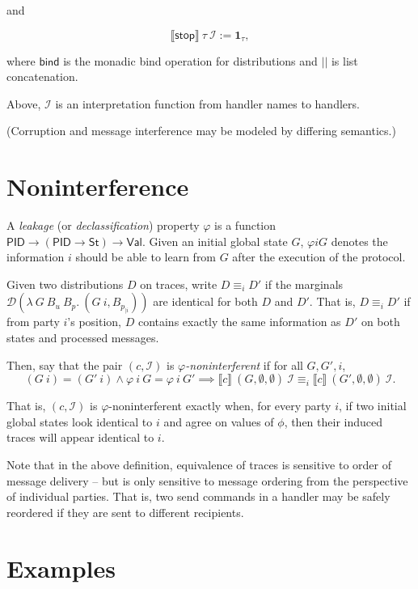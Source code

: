 \documentclass{article}
\newcommand{\Val}{\mathsf{Val}}
\newcommand{\St}{\mathsf{St}}
\newcommand{\PID}{\mathsf{PID}}
\begin{document}
and

\[\llbracket \textsf{stop} \rrbracket\ \tau\ \mathcal{I} := \mathbf{1}_{\tau},\]

where $\textsf{bind}$ is the monadic bind operation for distributions and $||$ is list concatenation.

Above, $\mathcal{I}$ is an interpretation function from handler names to handlers.


(Corruption and message interference may be modeled by differing semantics.)

\section{Noninterference}

A \emph{leakage} (or \emph{declassification}) property $\varphi$ is a function $\PID \to (\PID \to \St) \to \Val$. Given an initial global state $G$, $\varphi i G$ denotes the information $i$ should be able to learn from $G$ after the execution of the protocol.

Given two distributions $D$ on traces, write $D \equiv_i D'$ if the marginals $\mathcal{D} (\lambda\ G\ B_u\ B_p.\ (G\ i, B_{p_{| i}}))$ are identical for both $D$ and $D'$. That is, $D \equiv_i D'$ if from party $i$'s position, $D$ contains exactly the same information as $D'$ on both states and processed messages.

Then, say that the pair $(c, \mathcal{I})$ is \emph{$\varphi$-noninterferent} if for all $G, G', i$, 
\[ (G\ i) = (G'\ i) \wedge \varphi\ i\ G = \varphi\ i\ G' \implies \llbracket c \rrbracket\ (G, \emptyset, \emptyset)\ \mathcal{I} \equiv_i \llbracket c \rrbracket\ (G', \emptyset, \emptyset)\ \mathcal{I}.\]

That is, $(c, \mathcal{I})$ is $\varphi$-noninterferent exactly when, for every party $i$, if two initial global states look identical to $i$ and agree on values of $\phi$, then their induced traces will appear identical to $i$.

Note that in the above definition, equivalence of traces is sensitive to order of message delivery -- but is only sensitive to message ordering from the perspective of individual parties. That is, two send commands in a handler may be safely reordered if they are sent to different recipients.

\section{Examples}
\end{document}
